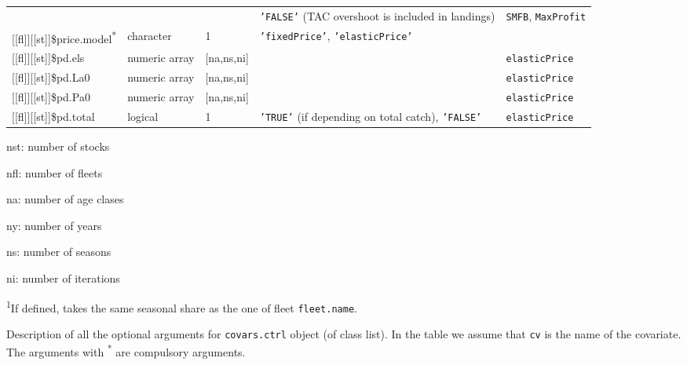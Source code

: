 \begin{landscape}
\begin{table}[!ht]
\begin{footnotesize}
\begin{threeparttable}
\begin{tabular}{lllll}
         &  &  & \texttt{'FALSE'} (TAC overshoot is included in landings) & \texttt{SMFB}, \texttt{MaxProfit} \\
        {[[fl]]}[[st]]\$price.model\textsuperscript{*} & character & 1 & \texttt{'fixedPrice'}, \texttt{'elasticPrice'} &  \\
        {[[fl]]}[[st]]\$pd.els & numeric array & [na,ns,ni] &  &  \texttt{elasticPrice} \\
        {[[fl]]}[[st]]\$pd.La0 & numeric array & [na,ns,ni] &  &  \texttt{elasticPrice} \\
        {[[fl]]}[[st]]\$pd.Pa0 & numeric array & [na,ns,ni] &  &  \texttt{elasticPrice} \\
        {[[fl]]}[[st]]\$pd.total & logical & 1 & \texttt{'TRUE'} (if depending on total catch), \texttt{'FALSE'} & 
          \texttt{elasticPrice} \\
        \hline
      \end{tabular}
      
      \begin{tablenotes}
        \item nst: number of stocks
        \item nfl: number of fleets
        \item na: number of age clases
        \item ny: number of years
        \item ns: number of seasons
        \item ni: number of iterations
        \item \textsuperscript{1}If defined, takes the same seasonal share as the one of fleet \texttt{fleet.name}.
      \end{tablenotes}
      
    \end{threeparttable}
  \end{footnotesize}

\end{table}	


\begin{table}[!ht]

  \centering
  \begin{footnotesize}

    \caption{Description of all the optional arguments for \texttt{covars.ctrl} object (of class list).
    In the table we assume that \texttt{cv} is the name of the covariate.
    The arguments with \textsuperscript{*} are compulsory arguments.}
    

\end{footnotesize}
\end{table}
\end{landscape}
